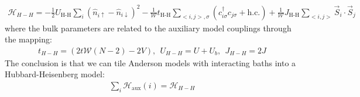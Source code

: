 \documentclass{report}
\numberwithin{equation}{section}
\begin{document}
\begin{equation}\begin{aligned}
	\mathcal{H}_{H-H} = - \frac{1}{2}U_\text{H-H}\sum_{i} \left(\hat n_{i \uparrow} - \hat n_{i \downarrow} \right)^2 - \frac{1}{\mathcal{W}}t_\text{H-H}\sum_{<i,j>,\sigma}\left(c^\dagger_{i\sigma}c_{j\sigma} + \text{h.c.}\right) + \frac{1}{\mathcal{W}}J_\text{H-H}\sum_{<i,j>} \vec{S}_i\cdot\vec{S}_j
\end{aligned}\end{equation}
where the bulk parameters are related to the auxiliary model couplings through the mapping:
\begin{equation}\begin{aligned}
	\label{map_aux_bulk}
	t_{H-H} = \left(2t \mathcal{W}(N-2) - 2V\right),~ ~ U_{H-H} = U + U_b, ~ ~ J_{H-H} = 2J
\end{aligned}\end{equation}
The conclusion is that we can tile Anderson models with interacting baths into a Hubbard-Heisenberg model:
\begin{equation}\begin{aligned}
	\label{siam_to_hubb}
	\sum_i \mathcal{H}_\text{aux}(i) = \mathcal{H}_{H-H}
\end{aligned}\end{equation}
\end{document}
